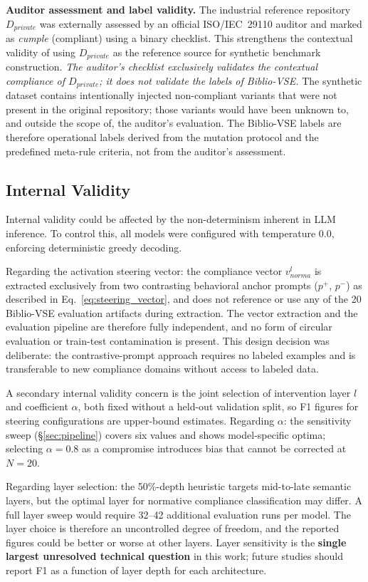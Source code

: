 \documentclass{ieeeaccess}
\begin{document}
\textbf{Auditor assessment and label validity.} The industrial reference repository $D_{private}$ was externally assessed by an official ISO/IEC~29110 auditor and marked as \emph{cumple} (compliant) using a binary checklist. This strengthens the contextual validity of using $D_{private}$ as the reference source for synthetic benchmark construction. \emph{The auditor's checklist exclusively validates the contextual compliance of $D_{private}$; it does not validate the labels of Biblio-VSE.} The synthetic dataset contains intentionally injected non-compliant variants that were not present in the original repository; those variants would have been unknown to, and outside the scope of, the auditor's evaluation. The Biblio-VSE labels are therefore operational labels derived from the mutation protocol and the predefined meta-rule criteria, not from the auditor's assessment.

\subsection{Internal Validity}

Internal validity could be affected by the non-determinism inherent in LLM inference. To control this, all models were configured with temperature 0.0, enforcing deterministic greedy decoding.

Regarding the activation steering vector: the compliance vector $v_{norma}^l$ is extracted exclusively from two contrasting behavioral anchor prompts ($p^+$, $p^-$) as described in Eq.~\ref{eq:steering_vector}, and does not reference or use any of the 20 Biblio-VSE evaluation artifacts during extraction. The vector extraction and the evaluation pipeline are therefore fully independent, and no form of circular evaluation or train-test contamination is present. This design decision was deliberate: the contrastive-prompt approach requires no labeled examples and is transferable to new compliance domains without access to labeled data.

A secondary internal validity concern is the joint selection of intervention layer $l$ and coefficient $\alpha$, both fixed without a held-out validation split, so F1 figures for steering configurations are upper-bound estimates. Regarding $\alpha$: the sensitivity sweep (§\ref{sec:pipeline}) covers six values and shows model-specific optima; selecting $\alpha=0.8$ as a compromise introduces bias that cannot be corrected at $N=20$.

Regarding layer selection: the 50\%-depth heuristic targets mid-to-late semantic layers, but the optimal layer for normative compliance classification may differ. A full layer sweep would require 32--42 additional evaluation runs per model. The layer choice is therefore an uncontrolled degree of freedom, and the reported figures could be better or worse at other layers. Layer sensitivity is the \textbf{single largest unresolved technical question} in this work; future studies should report F1 as a function of layer depth for each architecture.
\end{document}
